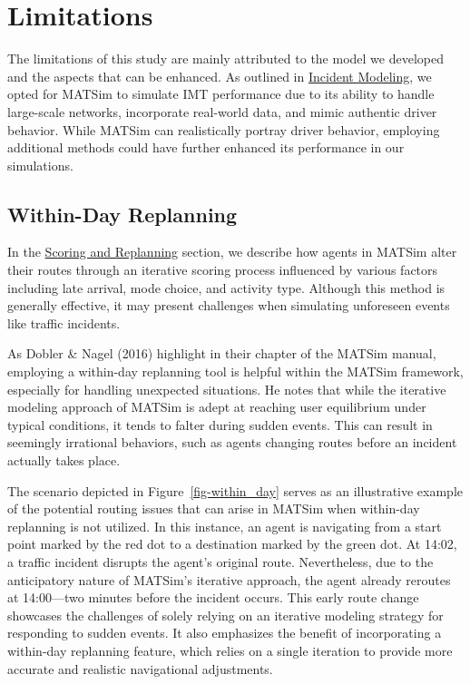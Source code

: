 \documentclass[fancy, oneside, mastersfancy, ms]{byuthesis}
\begin{document}
\hypertarget{sec-limitations}{%
\section{Limitations}\label{sec-limitations}}

The limitations of this study are mainly attributed to the model we
developed and the aspects that can be enhanced. As outlined in
\protect\hyperlink{sec-inc_modeling}{Incident Modeling}, we opted for
MATSim to simulate IMT performance due to its ability to handle
large-scale networks, incorporate real-world data, and mimic authentic
driver behavior. While MATSim can realistically portray driver behavior,
employing additional methods could have further enhanced its performance
in our simulations.

\hypertarget{sec-within-day}{%
\subsection{Within-Day Replanning}\label{sec-within-day}}

In the \protect\hyperlink{sec-MATSim_Score}{Scoring and Replanning}
section, we describe how agents in MATSim alter their routes through an
iterative scoring process influenced by various factors including late
arrival, mode choice, and activity type. Although this method is
generally effective, it may present challenges when simulating
unforeseen events like traffic incidents.

As Dobler \& Nagel (2016) highlight in their chapter of the MATSim
manual, employing a within-day replanning tool is helpful within the
MATSim framework, especially for handling unexpected situations. He
notes that while the iterative modeling approach of MATSim is adept at
reaching user equilibrium under typical conditions, it tends to falter
during sudden events. This can result in seemingly irrational behaviors,
such as agents changing routes before an incident actually takes place.

The scenario depicted in Figure~\ref{fig-within_day} serves as an
illustrative example of the potential routing issues that can arise in
MATSim when within-day replanning is not utilized. In this instance, an
agent is navigating from a start point marked by the red dot to a
destination marked by the green dot. At 14:02, a traffic incident
disrupts the agent's original route. Nevertheless, due to the
anticipatory nature of MATSim's iterative approach, the agent already
reroutes at 14:00---two minutes before the incident occurs. This early
route change showcases the challenges of solely relying on an iterative
modeling strategy for responding to sudden events. It also emphasizes
the benefit of incorporating a within-day replanning feature, which
relies on a single iteration to provide more accurate and realistic
navigational adjustments.
\end{document}
